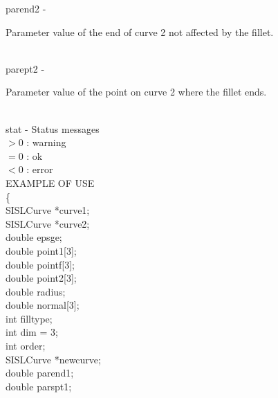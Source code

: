         \>\>    {\fov parend2}  \> - \> \begin{minipg2}
                        Parameter value of the end of curve 2 not affected
                        by the fillet.
                                \end{minipg2}\\[0.8ex]
        \>\>    {\fov parept2}  \> - \> \begin{minipg2}
                        Parameter value of the point on curve 2 where the
                        fillet ends.
                                \end{minipg2}\\[0.8ex]
        \>\>    {\fov stat}     \> - \> Status messages\\
                \>\>\>\>\>              $> 0$   : warning\\
                \>\>\>\>\>              $= 0$   : ok\\
                \>\>\>\>\>              $< 0$   : error\\
\newpagetabs
EXAMPLE OF USE\\
                \>      \{ \\
                \>\>    SISLCurve       \>      *{\fov curve1};\\
                \>\>    SISLCurve       \>      *{\fov curve2};\\
                \>\>    double  \>      {\fov epsge};\\
                \>\>    double  \>      {\fov point1}[3];\\
                \>\>    double  \>      {\fov pointf}[3];\\
                \>\>    double  \>      {\fov point2}[3];\\
                \>\>    double  \>      {\fov radius};\\
                \>\>    double  \>      {\fov normal}[3];\\
                \>\>    int     \>      {\fov filltype};\\
                \>\>    int     \>      {\fov dim} = 3;\\
                \>\>    int     \>      {\fov order};\\
                \>\>    SISLCurve       \>      *{\fov newcurve};\\
                \>\>    double  \>      {\fov parend1};\\
                \>\>    double  \>      {\fov parspt1};\\
